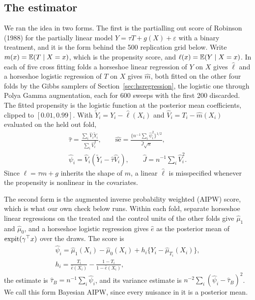 \subsection{The estimator}

We ran the idea in two forms. The first is the partialling out score of Robinson (1988) for the partially linear model $Y = \tau T + g(X) + \varepsilon$ with a binary treatment, and it is the form behind the 500 replication grid below. Write $m(x) = \mathbb{E}(T \mid X = x)$, which is the propensity score, and $\ell(x) = \mathbb{E}(Y \mid X = x)$. In each of five cross fitting folds a horseshoe linear regression of $Y$ on $X$ gives $\hat\ell$ and a horseshoe logistic regression of $T$ on $X$ gives $\hat m$, both fitted on the other four folds by the Gibbs samplers of Section~\ref{sec:hsregression}, the logistic one through Polya Gamma augmentation, each for 600 sweeps with the first 200 discarded. The fitted propensity is the logistic function at the posterior mean coefficients, clipped to $[0.01, 0.99]$. With $\tilde Y_i = Y_i - \hat\ell(X_i)$ and $\hat V_i = T_i - \hat m(X_i)$ evaluated on the held out fold,
\[
\begin{gathered}
\hat\tau = \frac{\sum_i\hat V_i\tilde Y_i}{\sum_i\hat V_i^2},
\qquad
\widehat{\mathrm{se}} = \frac{\{n^{-1}\sum_i\hat\psi_i^2\}^{1/2}}{\hat J\sqrt n}, \\
\hat\psi_i = \hat V_i(\tilde Y_i - \hat\tau\hat V_i),
\qquad
\hat J = n^{-1}\sum_i\hat V_i^2.
\end{gathered}
\]
Since $\ell = \tau m + g$ inherits the shape of $m$, a linear $\hat\ell$ is misspecified whenever the propensity is nonlinear in the covariates.

The second form is the augmented inverse probability weighted (AIPW) score, which is what our own check below runs. Within each fold, separate horseshoe linear regressions on the treated and the control units of the other folds give $\hat\mu_1$ and $\hat\mu_0$, and a horseshoe logistic regression gives $\hat e$ as the posterior mean of $\operatorname{expit}(\gamma^\top x)$ over the draws. The score is
\[
\begin{gathered}
\hat\psi_i = \hat\mu_1(X_i) - \hat\mu_0(X_i) + h_i\bigl\{Y_i - \hat\mu_{T_i}(X_i)\bigr\}, \\
h_i = \frac{T_i}{\hat e(X_i)} - \frac{1 - T_i}{1 - \hat e(X_i)},
\end{gathered}
\]
the estimate is $\hat\tau_B = n^{-1}\sum_i\hat\psi_i$, and its variance estimate is $n^{-2}\sum_i(\hat\psi_i - \hat\tau_B)^2$. We call this form Bayesian AIPW, since every nuisance in it is a posterior mean.

